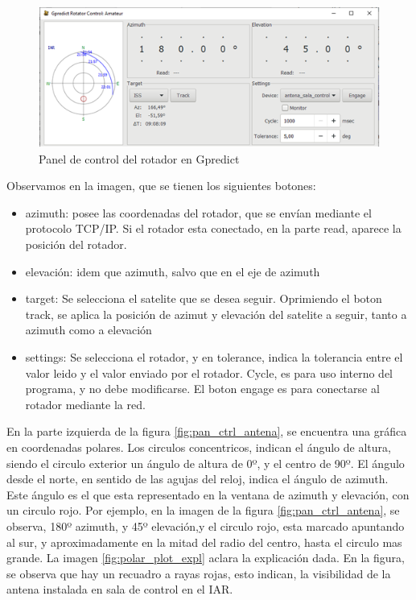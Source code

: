 \vspace{20mm}
\begin{figure}[ht]
	\includegraphics{rotador_select}
	\caption{Panel de control del rotador en Gpredict}
	\label{fig:panel_control_gpr}
\end{figure}

Observamos en la imagen, que se tienen los siguientes botones: 

\begin{itemize}	
	\item azimuth: posee las coordenadas del rotador, que se envían mediante el protocolo TCP/IP. Si el rotador esta conectado, en la parte read, aparece la posición del rotador.  
	\item elevación: idem que azimuth, salvo que en el eje de azimuth  
	\item target: Se selecciona el satelite que se desea seguir. Oprimiendo el boton track, se aplica la posición de azimut y elevación del satelite a seguir, tanto a azimuth como a elevación 
	\item settings: Se selecciona el rotador, y en tolerance, indica la tolerancia entre el valor leido y el valor enviado por el rotador. Cycle, es para uso interno del programa, y no debe modificarse. El boton engage es para conectarse al rotador mediante la red.   
\end{itemize}


En la parte izquierda de la figura \ref{fig:pan_ctrl_antena}, se encuentra una gráfica en coordenadas polares. Los circulos concentricos, indican el ángulo de altura, siendo el circulo exterior un ángulo de altura de 0º, y el centro de 90º. El ángulo desde el norte, en sentido de las agujas del reloj, indica el ángulo de azimuth. Este ángulo es el que esta representado en la ventana de azimuth y elevación, con un circulo rojo. Por ejemplo, en la imagen de la figura \ref{fig:pan_ctrl_antena}, se observa, 180º azimuth, y 45º elevación,y el circulo rojo, esta marcado apuntando al sur, y aproximadamente en la mitad del radio del centro, hasta el circulo mas grande. La imagen \ref{fig:polar_plot_expl} aclara la explicación dada. En la figura, se observa que hay un recuadro a rayas rojas, esto indican, la visibilidad de la antena instalada en sala de control en el IAR. 


